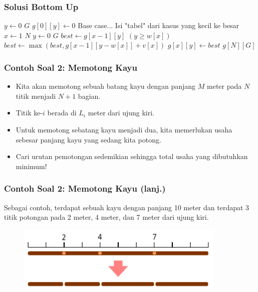 \begin{frame}
\frametitle{Solusi Bottom Up}
\begin{codebox}
\li \For $y \gets 0$ \To $G$ \Do
\li   $g[0][y] \gets 0$ \Comment Base case...
    \End
\zi
\li \Comment Isi "tabel" dari kasus yang kecil ke besar
\li \For $x \gets 1$ \To $N$ \Do
\li   \For $y \gets 0$ \To $G$ \Do
\li     $best \gets g[x-1][y]$
\li     \If $(y \geq w[x])$ \Then
\li       $best \gets \max(best, g[x - 1][y-w[x]] + v[x])$
        \End  
\li     $g[x][y] \gets best$
      \End
    \End    
\li \Return $g[N][G]$
    \End
\end{codebox}
\end{frame}

\begin{frame}
\frametitle{Contoh Soal 2: Memotong Kayu }
\begin{itemize}
  \item Kita akan memotong sebuah batang kayu dengan panjang $M$ meter pada $N$ titik menjadi $N+1$ bagian.
  \item Titik ke-$i$ berada di $L_i$ meter dari ujung kiri.
  \item Untuk memotong sebatang kayu menjadi dua, kita memerlukan usaha \alert{sebesar panjang kayu yang sedang kita potong}.
  \item Cari urutan pemotongan sedemikian sehingga total usaha yang dibutuhkan minimum!
\end{itemize}
\end{frame}

\begin{frame}
\frametitle{Contoh Soal 2: Memotong Kayu (lanj.)}
Sebagai contoh, terdapat sebuah kayu dengan panjang 10 meter dan terdapat 3 titik potongan pada 2 meter, 4 meter, dan 7 meter dari ujung kiri.
\begin{figure}
  \includegraphics[width=10cm]{asset/cutting-stick-1.pdf}
\end{figure}
\end{frame}

